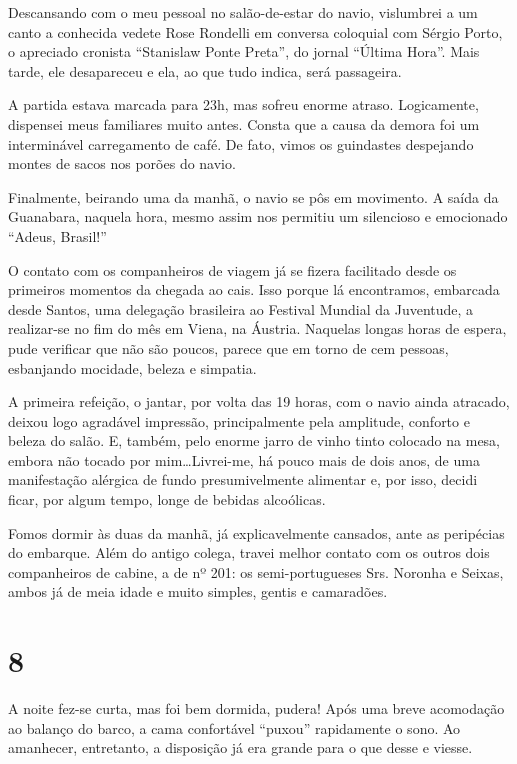 Descansando com o meu pessoal no salão-de-estar do navio, vislumbrei a um canto a conhecida vedete Rose Rondelli em conversa coloquial com Sérgio Porto, o apreciado cronista ``Stanislaw Ponte Preta'', do jornal ``Última Hora''. Mais tarde, ele desapareceu e ela, ao que tudo indica, será passageira.

A partida estava marcada para 23h, mas sofreu enorme atraso. Logicamente, dispensei meus familiares muito antes. Consta que a causa da demora foi um interminável carregamento de café. De fato, vimos os guindastes despejando montes de sacos nos porões do navio.

Finalmente, beirando uma da manhã, o navio se pôs em movimento. A saída da Guanabara, naquela hora, mesmo assim nos permitiu um silencioso e emocionado ``Adeus, Brasil!''

O contato com os companheiros de viagem já se fizera facilitado desde os primeiros momentos da chegada ao cais. Isso porque lá encontramos, embarcada desde Santos, uma delegação brasileira ao Festival Mundial da Juventude, a realizar-se no fim do mês em Viena, na Áustria. Naquelas longas horas de espera, pude verificar que não são poucos, parece que em torno de cem pessoas, esbanjando mocidade, beleza e simpatia.

A primeira refeição, o jantar, por volta das 19 horas, com o navio ainda atracado, deixou logo agradável impressão, principalmente pela amplitude, conforto e beleza do salão. E, também, pelo enorme jarro de vinho tinto colocado na mesa, embora não tocado por mim\ldots Livrei-me, há pouco mais de dois anos, de uma manifestação alérgica de fundo presumivelmente alimentar e, por isso, decidi ficar, por algum tempo, longe de bebidas alcoólicas.

Fomos dormir às duas da manhã, já explicavelmente cansados, ante as peripécias do embarque. Além do antigo colega, travei melhor contato com os outros dois companheiros de cabine, a de nº 201: os semi-portugueses Srs. Noronha e Seixas, ambos já de meia idade e muito simples, gentis e camaradões.

\section*{8 \adfflatleafright {}}
A noite fez-se curta, mas foi bem dormida, pudera! Após uma breve acomodação ao balanço do barco, a cama confortável ``puxou'' rapidamente o sono. Ao amanhecer, entretanto, a disposição já era grande para o que desse e viesse.


